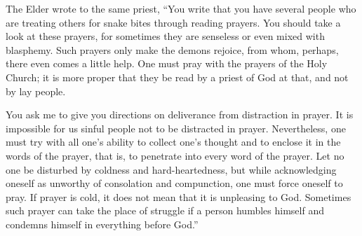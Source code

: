 The Elder wrote to the same priest, ``You write that you have several people who are treating others for snake bites through reading prayers. You should take a look at these prayers, for sometimes they are senseless or even mixed with blasphemy. Such prayers only make the demons rejoice, from whom, perhaps, there even comes a little help. One must pray with the prayers of the Holy Church; it is more proper that they be read by a priest of God at that, and not by lay people.

You ask me to give you directions on deliverance from distraction in prayer. It is impossible for us sinful people not to be distracted in prayer. Nevertheless, one must try with all one's ability to collect one's thought and to enclose it in the words of the prayer, that is, to penetrate into every word of the prayer. Let no one be disturbed by coldness and hard-heartedness, but while acknowledging oneself as unworthy of consolation and compunction, one must force oneself to pray. If prayer is cold, it does not mean that it is unpleasing to God. Sometimes such prayer can take the place of struggle if a person humbles himself and condemns himself in everything before God.''
